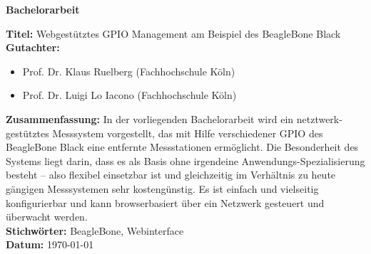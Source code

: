 \begin{center}
	\textbf{Bachelorarbeit}
\end{center}

\noindent \textbf{Titel:} Webgestütztes GPIO Management am Beispiel des BeagleBone Black\\

\noindent \textbf{Gutachter:}
\begin{itemize}
	\item Prof. Dr. Klaus Ruelberg (Fachhochschule Köln)
	\item Prof. Dr. Luigi Lo Iacono (Fachhochschule Köln)
\end{itemize}

\noindent \textbf{Zusammenfassung:} In der vorliegenden Bachelorarbeit wird ein netztwerk-gestütztes Messsystem vorgestellt, das mit Hilfe verschiedener GPIO des BeagleBone Black eine entfernte Messstationen ermöglicht. Die Besonderheit des Systems liegt darin, dass es als Basis ohne irgendeine Anwendungs-Spezialisierung besteht – also flexibel einsetzbar ist und gleichzeitig im Verhältnis zu heute gängigen Messsystemen sehr kostengünstig.  Es ist einfach und vielseitig konfigurierbar und kann browserbasiert über ein Netzwerk gesteuert und überwacht werden.\\

\noindent \textbf{Stichwörter:} BeagleBone, Webinterface\\

\noindent \textbf{Datum:} {\longdate \today}